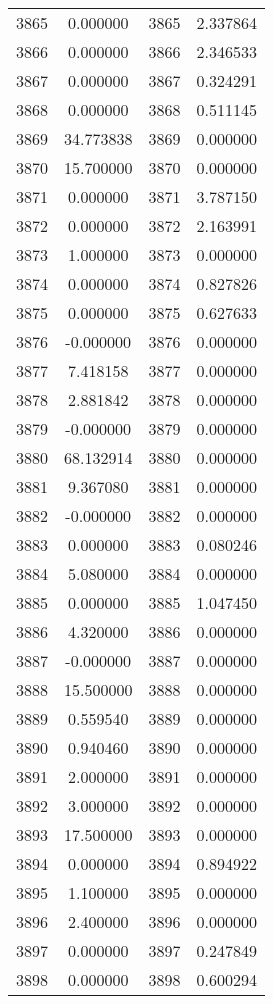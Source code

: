 \documentclass[12pt]{article}
\begin{document}
\begin{longtable}{@{}cccc@{}}
3865 & 0.000000 & 3865 & 2.337864 \\
3866 & 0.000000 & 3866 & 2.346533 \\
3867 & 0.000000 & 3867 & 0.324291 \\
3868 & 0.000000 & 3868 & 0.511145 \\
3869 & 34.773838 & 3869 & 0.000000 \\
3870 & 15.700000 & 3870 & 0.000000 \\
3871 & 0.000000 & 3871 & 3.787150 \\
3872 & 0.000000 & 3872 & 2.163991 \\
3873 & 1.000000 & 3873 & 0.000000 \\
3874 & 0.000000 & 3874 & 0.827826 \\
3875 & 0.000000 & 3875 & 0.627633 \\
3876 & -0.000000 & 3876 & 0.000000 \\
3877 & 7.418158 & 3877 & 0.000000 \\
3878 & 2.881842 & 3878 & 0.000000 \\
3879 & -0.000000 & 3879 & 0.000000 \\
3880 & 68.132914 & 3880 & 0.000000 \\
3881 & 9.367080 & 3881 & 0.000000 \\
3882 & -0.000000 & 3882 & 0.000000 \\
3883 & 0.000000 & 3883 & 0.080246 \\
3884 & 5.080000 & 3884 & 0.000000 \\
3885 & 0.000000 & 3885 & 1.047450 \\
3886 & 4.320000 & 3886 & 0.000000 \\
3887 & -0.000000 & 3887 & 0.000000 \\
3888 & 15.500000 & 3888 & 0.000000 \\
3889 & 0.559540 & 3889 & 0.000000 \\
3890 & 0.940460 & 3890 & 0.000000 \\
3891 & 2.000000 & 3891 & 0.000000 \\
3892 & 3.000000 & 3892 & 0.000000 \\
3893 & 17.500000 & 3893 & 0.000000 \\
3894 & 0.000000 & 3894 & 0.894922 \\
3895 & 1.100000 & 3895 & 0.000000 \\
3896 & 2.400000 & 3896 & 0.000000 \\
3897 & 0.000000 & 3897 & 0.247849 \\
3898 & 0.000000 & 3898 & 0.600294 \\

\end{longtable}
\end{document}
